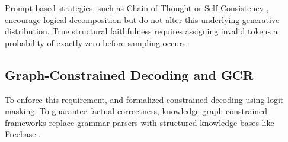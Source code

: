 \documentclass[11pt, letterpaper]{article}
\begin{document}
Prompt-based strategies, such as Chain-of-Thought \citep{wei2022cot} or Self-Consistency \citep{wang2023selfconsistency}, encourage logical decomposition but do not alter this underlying generative distribution. True structural faithfulness requires assigning invalid tokens a probability of exactly zero before sampling occurs.

\subsection{Graph-Constrained Decoding and GCR}

To enforce this requirement, \citet{geng2023grammarconstrained} and \citet{willard2023outlines} formalized constrained decoding using logit masking. To guarantee factual correctness, knowledge graph-constrained frameworks replace grammar parsers with structured knowledge bases like Freebase \citep{bollacker2008freebase}.
\end{document}

